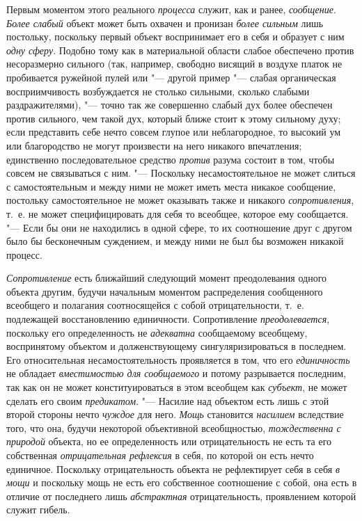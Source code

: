 Первым моментом этого реального
{\em процесса} служит,
как и ранее, {\em сообщение}.
{\em Более слабый} объект
может быть охвачен и пронизан {\em более
сильным} лишь постольку, поскольку первый объект
воспринимает его в себя и образует с ним
{\em одну сферу}. Подобно
тому как в материальной области слабое обеспечено против несоразмерно
сильного (так, например, свободно висящий в воздухе платок не пробивается
ружейной пулей или "--- другой пример "--- слабая
органическая восприимчивость возбуждается не столько сильными, сколько
слабыми раздражителями), "--- точно так же совершенно слабый
дух более обеспечен против сильного, чем такой дух, который ближе стоит к
этому сильному духу; если представить себе нечто совсем глупое или
неблагородное, то высокий ум или благородство не могут произвести на него
никакого впечатления; единственно последовательное средство
{\em против} разума
состоит в том, чтобы совсем не связываться с ним. "---
Поскольку несамостоятельное не может слиться с
самостоятельным и между ними не может иметь места никакое сообщение,
постольку самостоятельное не может оказывать также и никакого
{\em сопротивления},
т.~е. не может специфицировать для себя то всеобщее, которое
ему сообщается. "--- Если бы они не находились в одной сфере,
то их соотношение друг с другом было бы бесконечным
суждением, и между ними не был бы возможен никакой процесс.

{\em Сопротивление} есть
ближайший следующий момент преодолевания одного объекта другим, будучи
начальным моментом распределения сообщенного всеобщего и полагания
соотносящейся с собой отрицательности, т.~е. подлежащей восстановлению
единичности. Сопротивление
{\em преодолевается},
поскольку его определенность не
{\em адекватна}
сообщаемому всеобщему, воспринятому объектом и
долженствующему сингуляризироваться в последнем. Его относительная
несамостоятельность проявляется в том, что его
{\em единичность} не
обладает {\em вместимостью для
сообщаемого} и потому разрывается последним, так как он не
может конституироваться в этом всеобщем как
{\em субъект}, не может
сделать его своим {\em предикатом}. "---
Насилие над объектом есть лишь с этой второй стороны нечто
{\em чуждое} для него.
{\em Мощь} становится
{\em насилием} вследствие
того, что она, будучи некоторой объективной всеобщностью,
{\em тождественна с природой}
объекта, но ее определенность или отрицательность не есть та
его собственная {\em отрицательная
рефлексия} в себя, по которой он есть нечто единичное.
Поскольку отрицательность объекта не рефлектирует себя в себя
{\em в мощи} и поскольку
мощь не есть его собственное соотношение с собой, она есть в отличие от
последнего лишь {\em абстрактная}
отрицательность, проявлением которой служит гибель.

